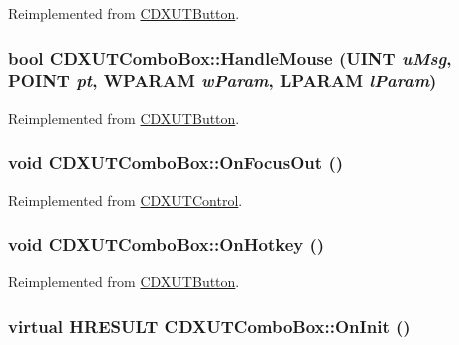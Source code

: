 Reimplemented from \hyperlink{class_c_d_x_u_t_button_ae8da8eb3729b62ac3651eeca42d72530}{CDXUTButton}.\hypertarget{class_c_d_x_u_t_combo_box_a1cc659081f04fdf657f644d9970a7df8}{
\subsubsection[{HandleMouse}]{\setlength{\rightskip}{0pt plus 5cm}bool CDXUTComboBox::HandleMouse (UINT {\em uMsg}, \/  POINT {\em pt}, \/  WPARAM {\em wParam}, \/  LPARAM {\em lParam})}}
\label{class_c_d_x_u_t_combo_box_a1cc659081f04fdf657f644d9970a7df8}


Reimplemented from \hyperlink{class_c_d_x_u_t_button_ac0bb3da0b5cc77e4cadfbbed72d3e5b7}{CDXUTButton}.\hypertarget{class_c_d_x_u_t_combo_box_a513be57f0d60315b255ef11f5998c268}{
\subsubsection[{OnFocusOut}]{\setlength{\rightskip}{0pt plus 5cm}void CDXUTComboBox::OnFocusOut ()}}
\label{class_c_d_x_u_t_combo_box_a513be57f0d60315b255ef11f5998c268}


Reimplemented from \hyperlink{class_c_d_x_u_t_control_afd5667a4ba9349e98db8c27a1b1d280d}{CDXUTControl}.\hypertarget{class_c_d_x_u_t_combo_box_a09eecfbd4d5173cf55c15c583b1a2209}{
\subsubsection[{OnHotkey}]{\setlength{\rightskip}{0pt plus 5cm}void CDXUTComboBox::OnHotkey ()}}
\label{class_c_d_x_u_t_combo_box_a09eecfbd4d5173cf55c15c583b1a2209}


Reimplemented from \hyperlink{class_c_d_x_u_t_button_ae63ba50da1c035a9aaa983bafd5eae97}{CDXUTButton}.\hypertarget{class_c_d_x_u_t_combo_box_a57760cc904757ae273c297245743f3af}{
\subsubsection[{OnInit}]{\setlength{\rightskip}{0pt plus 5cm}virtual HRESULT CDXUTComboBox::OnInit ()}}
\label{class_c_d_x_u_t_combo_box_a57760cc904757ae273c297245743f3af}


